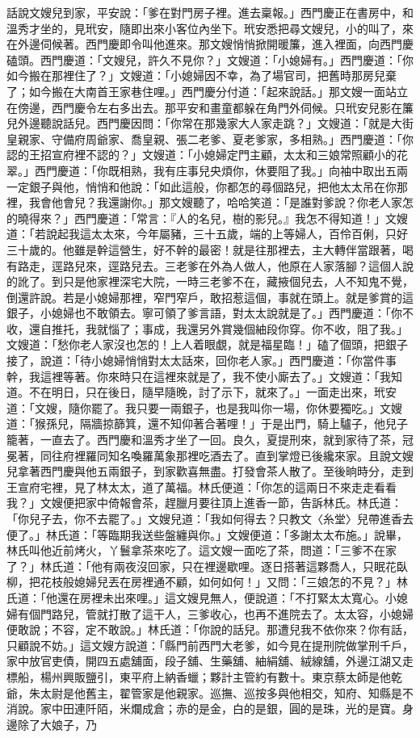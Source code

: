 \begin{showcontents}{}
話說文嫂兒到家，平安說：「爹在對門房子裡。進去稟報。」西門慶正在書房中，和溫秀才坐的，見玳安，隨即出來小客位內坐下。玳安悉把尋文嫂兒，小的叫了，來在外邊伺候著。西門慶即令叫他進來。那文嫂悄悄掀開暖簾，進入裡面，向西門慶磕頭。西門慶道：「文嫂兒，許久不見你？」文嫂道：「小媳婦有。」西門慶道：「你如今搬在那裡住了？」文嫂道：「小媳婦因不幸，為了場官司，把舊時那房兒棄了；如今搬在大南首王家巷住哩。」西門慶分付道：「起來說話。」那文嫂一面站立在傍邊，西門慶令左右多出去。那平安和畫童都躲在角門外伺候。只玳安兒影在簾兒外邊聽說話兒。西門慶因問：「你常在那幾家大人家走跳？」文嫂道：「就是大街皇親家、守備府周爺家、喬皇親、張二老爹、夏老爹家，多相熟。」西門慶道：「你認的王招宣府裡不認的？」文嫂道：「小媳婦定門主顧，太太和三娘常照顧小的花翠。」西門慶道：「你既相熟，我有庄事兒央煩你，休要阻了我。」向袖中取出五兩一定銀子與他，悄悄和他說：「如此這般，你都怎的尋個路兒，把他太太吊在你那裡，我會他會兒？我還謝你。」那文嫂聽了，哈哈笑道：「是誰對爹說？你老人家怎的曉得來？」西門慶道：「常言：『人的名兒，樹的影兒。』我怎不得知道！」文嫂道：「若說起我這太太來，今年屬豬，三十五歲，端的上等婦人，百伶百俐，只好三十歲的。他雖是幹這營生，好不幹的最密！就是往那裡去，主大轉伴當跟著，喝有路走，逕路兒來，逕路兒去。三老爹在外為人做人，他原在人家落腳？這個人說的訛了。到只是他家裡深宅大院，一時三老爹不在，藏掖個兒去，人不知鬼不覺，倒還許說。若是小媳婦那裡，窄門窄戶，敢招惹這個，事就在頭上。就是爹賞的這銀子，小媳婦也不敢領去。寧可領了爹言語，對太太說就是了。」西門慶道：「你不收，還自推托，我就惱了；事成，我還另外賞幾個紬段你穿。你不收，阻了我。」文嫂道：「愁你老人家沒也怎的！上人着眼覷，就是福星臨！」磕了個頭，把銀子接了，說道：「待小媳婦悄悄對太太話來，回你老人家。」西門慶道：「你當件事幹，我這裡等著。你來時只在這裡來就是了，我不使小廝去了。」文嫂道：「我知道。不在明日，只在後日，隨早隨晚，討了示下，就來了。」一面走出來，玳安道：「文嫂，隨你罷了。我只要一兩銀子，也是我叫你一場，你休要獨吃。」文嫂道：「猴孫兒，隔牆掠篩箕，還不知仰著合著哩！」于是出門，騎上驢子，他兒子籠著，一直去了。西門慶和溫秀才坐了一回。良久，夏提刑來，就到家待了茶，冠冕著，同往府裡羅同知名喚羅萬象那裡吃酒去了。直到掌燈已後纔來家。且說文嫂兒拿著西門慶與他五兩銀子，到家歡喜無盡。打發會茶人散了。至後晌時分，走到王宣府宅裡，見了林太太，道了萬福。林氏便道：「你怎的這兩日不來走走看看我？」文嫂便把家中倚報會茶，趕臘月要往頂上進香一節，告訴林氏。林氏道：「你兒子去，你不去罷了。」文嫂兒道：「我如何得去？只教文〈糸堂〉兒帶進香去便了。」林氏道：「等臨期我送些盤纏與你。」文嫂便道：「多謝太太布施。」說畢，林氏叫他近前烤火，丫鬟拿茶來吃了。這文嫂一面吃了茶，問道：「三爹不在家了？」林氏道：「他有兩夜沒回家，只在裡邊歇哩。逐日搭著這夥喬人，只眠花臥柳，把花枝般媳婦兒丟在房裡通不顧，如何如何！」又問：「三娘怎的不見？」林氏道：「他還在房裡未出來哩。」這文嫂見無人，便說道：「不打緊太太寬心。小媳婦有個門路兒，管就打散了這干人，三爹收心，也再不進院去了。太太容，小媳婦便敢說；不容，定不敢說。」林氏道：「你說的話兒。那遭兒我不依你來？你有話，只顧說不妨。」這文嫂方說道：「縣門前西門大老爹，如今見在提刑院做掌刑千戶，家中放官吏債，開四五處舖面，段子舖、生藥舖、紬絹舖、絨線舖，外邊江湖又走標船，楊州興販鹽引，東平府上納香蠟；夥計主管約有數十。東京蔡太師是他乾爺，朱太尉是他舊主，翟管家是他親家。巡撫、巡按多與他相交，知府、知縣是不消說。家中田連阡陌，米爛成倉；赤的是金，白的是銀，圓的是珠，光的是寶。身邊除了大娘子，乃
\end{showcontents}
